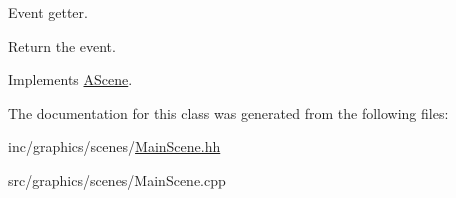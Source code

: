 Event getter. 

Return the event. 

Implements \hyperlink{classAScene_af521e5e6d30a5d2e5d30eb333e4d3abd}{A\+Scene}.



The documentation for this class was generated from the following files\+:\begin{DoxyCompactItemize}
\item 
inc/graphics/scenes/\hyperlink{MainScene_8hh}{Main\+Scene.\+hh}\item 
src/graphics/scenes/Main\+Scene.\+cpp\end{DoxyCompactItemize}
